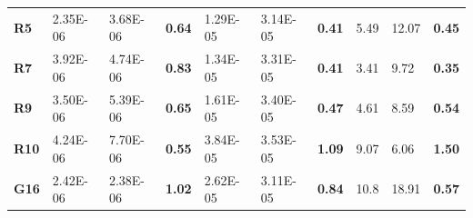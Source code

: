 \documentclass[encoding=utf8,british]{tumphthesis}
\begin{document}
\begin{table}[H]
\begin{subtable}{1\textwidth}
{\begin{tabular}{|l|llr|llr|llr|}
\rowcolor[HTML]{CFE2F3} 
\textbf{R5}                               & 2.35E-06                                             & 3.68E-06                                              & \textbf{0.64}                                    & 1.29E-05                                            & 3.14E-05                                              & \textbf{0.41}                                    & 5.49                                                 & 12.07                                                 & \textbf{0.45}                                    \\
\textbf{R7}                               & 3.92E-06                                             & 4.74E-06                                              & \textbf{0.83}                                    & 1.34E-05                                             & 3.31E-05                                              & \textbf{0.41}                                    & 3.41                                                 & 9.72                                                  & \textbf{0.35}                                    \\
\rowcolor[HTML]{CFE2F3} 
\textbf{R9}                               & 3.50E-06                                             & 5.39E-06                                              & \textbf{0.65}                                    & 1.61E-05                                             & 3.40E-05                                              & \textbf{0.47}                                    & 4.61                                                 & 8.59                                                  & \textbf{0.54}                                    \\
\textbf{R10}                              & 4.24E-06                                             & 7.70E-06                                              & \textbf{0.55}                                    & 3.84E-05                                             & 3.53E-05                                              & \textbf{1.09}                                    & 9.07                                                 & 6.06                                                  & \textbf{1.50}                                    \\
\rowcolor[HTML]{CFE2F3} 
\textbf{G16}                              & 2.42E-06                                             & 2.38E-06                                              & \textbf{1.02}                                    & 2.62E-05                                             & 3.11E-05                                              & \textbf{0.84}                                    & 10.8                                                 & 18.91                                                 & \textbf{0.57}                                    \\ \hline

\end{tabular}}
\end{subtable}
\end{table}
\end{document}
